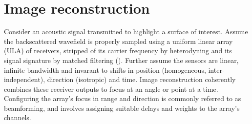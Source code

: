 {%
% 
% 
% 


%

%





\section{Image reconstruction}\label{methods}

Consider an acoustic signal transmitted to highlight a surface of interest. Assume the backscattered wavefield is properly sampled using a uniform linear array (ULA) of receivers, stripped of its carrier frequency by heterodyning and its signal signature by matched filtering (). Further assume the sensors are linear, infinite bandwidth and invarant to shifts in position (homogeneous, inter-independent), direction (isotropic) and time. Image reconstruction coherently combines these receiver outputs to focus at an angle or point at a time. Configuring the array's focus in range and direction is commonly referred to as beamforming, and involves assigning suitable delays and weights to the array's channels.

}
